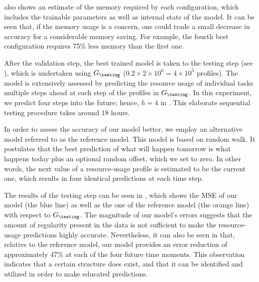  also shows an estimate of the memory required by each
configuration, which includes the trainable parameters as well as internal state
of the model. It can be seen that, if the memory usage is a concern, one could
trade a small decrease in accuracy for a considerable memory saving. For
example, the fourth best configuration requires 75\% less memory than the first
one.

After the validation step, the best trained model is taken to the testing step
(see ), which is undertaken using $G_\testing$ ($0.2 \times
2 \times 10^6 = 4 \times 10^5$ profiles). The model is extensively assessed by
predicting the resource usage of individual tasks multiple steps ahead at each
step of the profiles in $G_\testing$. In this experiment, we predict four steps
into the future; hence, $h = 4$ in . This elaborate
sequential testing procedure takes around 18 hours.

In order to assess the accuracy of our model better, we employ an alternative
model referred to as the reference model. This model is based on random walk. It
postulates that the best prediction of what will happen tomorrow is what happens
today plus an optional random offset, which we set to zero. In other words, the
next value of a resource-usage profile is estimated to be the current one, which
results in four identical predictions at each time step.

The results of the testing step can be seen in , which shows
the \ac{MSE} of our model (the blue line) as well as the one of the reference
model (the orange line) with respect to $G_\testing$. The magnitude of our
model's errors suggests that the amount of regularity present in the data is not
sufficient to make the resource-usage predictions highly accurate. Nevertheless,
it can also be seen in  that, relative to the reference
model, our model provides an error reduction of approximately 47\% at each of
the four future time moments. This observation indicates that a certain
structure does exist, and that it can be identified and utilized in order to
make educated predictions.

